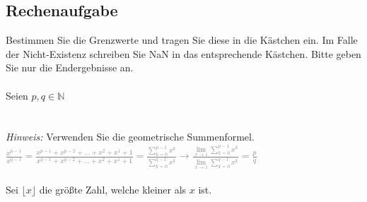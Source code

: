 \documentclass[a4paper]{article}
\begin{document}
\setcounter{section}{6}
\subsection{Rechenaufgabe}
Bestimmen Sie die Grenzwerte und tragen Sie diese in die Kästchen ein. Im Falle der Nicht-Existenz schreiben Sie NaN in das entsprechende Kästchen. Bitte geben Sie nur die Endergebnisse an.\\\\
\fbox{\parbox{\linewidth}{
\[\lim\limits_{x_\to 0}\frac{x-3}{x-4}=\frac{3}{4}\]
}}\vspace*{5mm}
Seien $p,q \in \mathbb{N}$\\
\fbox{\parbox{\linewidth}{
\[\lim\limits_{x_\to 1}\frac{x^p-1}{x^q-1}=\frac{p}{q}\]
}}\\\\
\textit{Hinweis:} Verwenden Sie die geometrische Summenformel.\\
\textcolor{gray}{$\frac{x^{p-1}}{x^{q-1}} = \frac{x^{p-1} + x^{p-2} + ... + x^{2} + x^{1} + 1}{x^{q-1} + x^{q-2} + ... + x^{2} + x^{1} + 1} = \frac{\sum\limits_{k = 0}^{p - 1} x^k}{\sum\limits_{k = 0}^{q - 1} x^k} \rightarrow \frac{\lim\limits_{x \rightarrow 1} \sum\limits_{k = 0}^{p - 1} x^k}{\lim\limits_{x \rightarrow 1} \sum\limits_{k = 0}^{q - 1} x^k} = \frac{p}{q}$}\\\\
Sei $\lfloor x\rfloor$ die größte Zahl, welche kleiner als $x$ ist.\\
\fbox{\parbox{\linewidth}{
\[\lim\limits_{x_\downarrow 1}(x-\lfloor x\rfloor)=0\]
}}\vspace*{5mm}
\fbox{\parbox{\linewidth}{
\[\lim\limits_{x_\uparrow 1}(x-\lfloor x\rfloor)=1\]
}}\vspace*{5mm}
\end{document}
